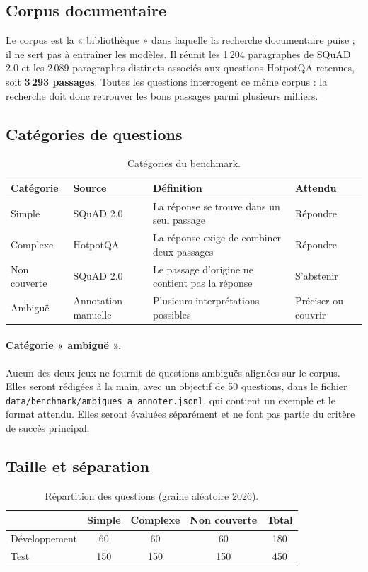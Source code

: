 \documentclass[11pt,a4paper]{article}
\begin{document}
\subsection{Corpus documentaire}
Le corpus est la « bibliothèque » dans laquelle la recherche documentaire puise ; il ne sert pas à
entraîner les modèles. Il réunit les 1\,204 paragraphes de SQuAD 2.0 et les 2\,089 paragraphes
distincts associés aux questions HotpotQA retenues, soit \textbf{3\,293 passages}. Toutes les
questions interrogent ce même corpus : la recherche doit donc retrouver les bons passages parmi
plusieurs milliers.

\subsection{Catégories de questions}
\begin{table}[H]
\centering\small
\begin{tabularx}{\textwidth}{l l Y l}
\toprule
\textbf{Catégorie} & \textbf{Source} & \textbf{Définition} & \textbf{Attendu} \\
\midrule
Simple & SQuAD 2.0 & La réponse se trouve dans un seul passage & Répondre \\
Complexe & HotpotQA & La réponse exige de combiner deux passages & Répondre \\
Non couverte & SQuAD 2.0 & Le passage d'origine ne contient pas la réponse & S'abstenir \\
Ambiguë & Annotation manuelle & Plusieurs interprétations possibles & Préciser ou couvrir \\
\bottomrule
\end{tabularx}
\caption{Catégories du benchmark.}
\label{tab:categories}
\end{table}

\paragraph{Catégorie « ambiguë ».} Aucun des deux jeux ne fournit de questions ambiguës alignées sur le
corpus. Elles seront rédigées à la main, avec un objectif de 50 questions, dans le fichier
\texttt{data/benchmark/ambigues\_a\_annoter.jsonl}, qui contient un exemple et le format attendu. Elles
seront évaluées séparément et ne font pas partie du critère de succès principal.

\subsection{Taille et séparation}
\begin{table}[H]
\centering\small
\begin{tabular}{l c c c c}
\toprule
& \textbf{Simple} & \textbf{Complexe} & \textbf{Non couverte} & \textbf{Total} \\
\midrule
Développement & 60 & 60 & 60 & 180 \\
Test & 150 & 150 & 150 & 450 \\
\bottomrule
\end{tabular}
\caption{Répartition des questions (graine aléatoire 2026).}
\label{tab:tailles}
\end{table}
\end{document}
